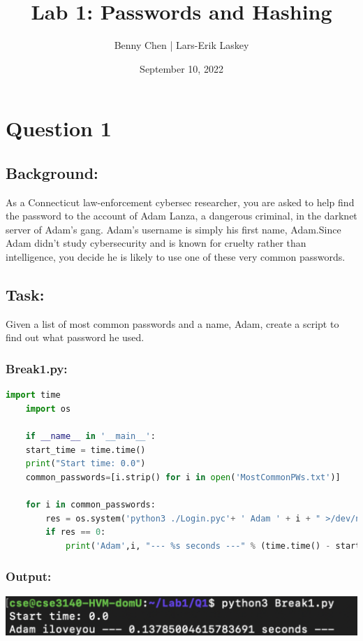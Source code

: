\documentclass{article}
\title{Lab 1: Passwords and Hashing}
\author{Benny Chen | Lars-Erik Laskey}
\date{September 10, 2022}
\begin{document}
\maketitle

\section{Question 1}
\subsection*{Background:}
As a Connecticut law-enforcement cybersec researcher, you are asked to help find the 
password to the account of Adam Lanza, a dangerous criminal, in the darknet server of Adam’s gang. 
Adam’s username is simply his first name, Adam.Since Adam didn’t study cybersecurity and is known 
for cruelty rather than intelligence, you decide he is likely to use one of these very common passwords.

\subsection*{Task:}
Given a list of most common passwords and a name, Adam, create a script to 
find out what password he used.

\subsubsection*{Break1.py:}
\begin{lstlisting}[language=Python]
    import time
    import os

    if __name__ in '__main__':
    start_time = time.time()
    print("Start time: 0.0")
    common_passwords=[i.strip() for i in open('MostCommonPWs.txt')]

    for i in common_passwords:
        res = os.system('python3 ./Login.pyc'+ ' Adam ' + i + " >/dev/null 2>&1")
        if res == 0:
            print('Adam',i, "--- %s seconds ---" % (time.time() - start_time))
\end{lstlisting}

\subsubsection*{Output:}
\begin{center}
    \includegraphics[scale=.55]{images/Q1_Output.png}    
\end{center}
\end{document}
